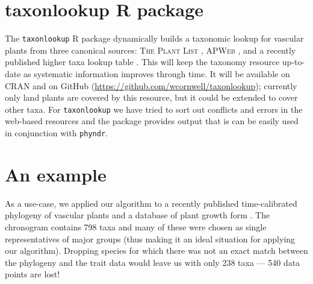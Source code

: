 \documentclass[a4paper,11pt]{article}
\newcommand{\phyndr}{\tt phyndr}
\newcommand{\taxonlookup}{\tt taxonlookup}
\begin{document}
\section{taxonlookup R package}

The {\taxonlookup} R package dynamically builds a taxonomic lookup for vascular plants from three canonical sources: \textsc{The Plant List} \citep{ThePlantList}, \textsc{APWeb} \citep{apweb}, and a recently published higher taxa lookup table \citep[][compiled by D.C. Tank, J.M. Eastman, J.M. Beaulieu, W.K. Cornwell, P.F. Stevens, and A.E. Zanne]{ZanneDryad}.  This will keep the taxonomy resource up-to-date as systematic information improves through time.  It will be available on CRAN and on GitHub (\url{https://github.com/wcornwell/taxonlookup}); currently only land plants are covered by this resource, but it could be extended to cover other taxa. For {\taxonlookup} we have tried to sort out conflicts and errors in the web-based resources and the package provides output that is can be easily used in conjunction with {\phyndr}.

\section{An example}

As a use-case, we applied our algorithm to a recently published time-calibrated phylogeny of vascular plants \citep{Magallon2015} and a database of plant growth form \citep{Zanne}. The \citet{Magallon2015} chronogram contains 798 taxa and many of these were chosen as single representatives of major groups (thus making it an ideal situation for applying our algorithm). Dropping species for which there was not an exact match between the phylogeny and the trait data would leave us with only 238 taxa --- 540 data points are lost!
\end{document}
